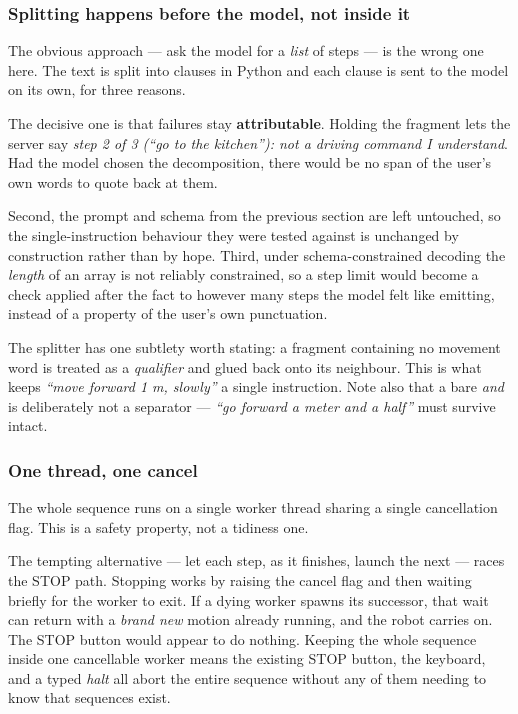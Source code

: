 \documentclass[11pt,a4paper]{article}
\begin{document}
\subsubsection{Splitting happens before the model, not inside it}
The obvious approach --- ask the model for a \emph{list} of steps --- is the
wrong one here. The text is split into clauses in Python and each clause is sent
to the model on its own, for three reasons.

The decisive one is that failures stay \textbf{attributable}. Holding the
fragment lets the server say \emph{step 2 of 3 (``go to the kitchen''): not a
driving command I understand}. Had the model chosen the decomposition, there
would be no span of the user's own words to quote back at them.

Second, the prompt and schema from the previous section are left untouched, so
the single-instruction behaviour they were tested against is unchanged by
construction rather than by hope. Third, under schema-constrained decoding the
\emph{length} of an array is not reliably constrained, so a step limit would
become a check applied after the fact to however many steps the model felt like
emitting, instead of a property of the user's own punctuation.

The splitter has one subtlety worth stating: a fragment containing no movement
word is treated as a \emph{qualifier} and glued back onto its neighbour. This is
what keeps \emph{``move forward 1 m, slowly''} a single instruction. Note also
that a bare \emph{and} is deliberately not a separator --- \emph{``go forward a
meter and a half''} must survive intact.

\subsubsection{One thread, one cancel}
The whole sequence runs on a single worker thread sharing a single cancellation
flag. This is a safety property, not a tidiness one.

The tempting alternative --- let each step, as it finishes, launch the next ---
races the STOP path. Stopping works by raising the cancel flag and then waiting
briefly for the worker to exit. If a dying worker spawns its successor, that
wait can return with a \emph{brand new} motion already running, and the robot
carries on. The STOP button would appear to do nothing. Keeping the whole
sequence inside one cancellable worker means the existing STOP button, the
keyboard, and a typed \emph{halt} all abort the entire sequence without any of
them needing to know that sequences exist.
\end{document}
